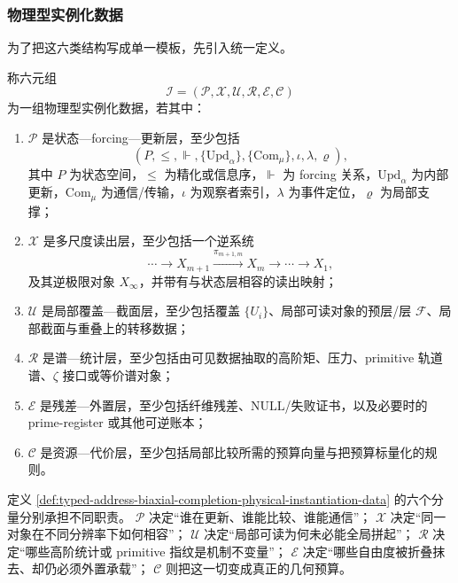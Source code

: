 \subsubsection{物理型实例化数据}\label{subsubsec:typed-address-biaxial-completion-physical-instantiation-data}
为了把这六类结构写成单一模板，先引入统一定义。

\begin{definition}[物理型实例化数据]\label{def:typed-address-biaxial-completion-physical-instantiation-data}
称六元组
\[
\mathcal I=
(\mathcal P,\mathcal X,\mathcal U,\mathcal R,\mathcal E,\mathcal C)
\]
为一组物理型实例化数据，若其中：
\begin{enumerate}
  \item \(\mathcal P\) 是状态—forcing—更新层，至少包括
  \[
  (P,\le,\Vdash,\{\mathrm{Upd}_\alpha\},\{\mathrm{Com}_\mu\},\iota,\lambda,\varrho),
  \]
  其中 \(P\) 为状态空间，\(\le\) 为精化或信息序，\(\Vdash\) 为 forcing 关系，\(\mathrm{Upd}_\alpha\) 为内部更新，\(\mathrm{Com}_\mu\) 为通信/传输，\(\iota\) 为观察者索引，\(\lambda\) 为事件定位，\(\varrho\) 为局部支撑；
  \item \(\mathcal X\) 是多尺度读出层，至少包括一个逆系统
  \[
  \cdots \longrightarrow X_{m+1}\xrightarrow{\pi_{m+1,m}}X_m\longrightarrow\cdots\longrightarrow X_1,
  \]
  及其逆极限对象 \(X_\infty\)，并带有与状态层相容的读出映射；
  \item \(\mathcal U\) 是局部覆盖—截面层，至少包括覆盖 \(\{U_i\}\)、局部可读对象的预层/层 \(\mathscr F\)、局部截面与重叠上的转移数据；
  \item \(\mathcal R\) 是谱—统计层，至少包括由可见数据抽取的高阶矩、压力、primitive 轨道谱、\(\zeta\) 接口或等价谱对象；
  \item \(\mathcal E\) 是残差—外置层，至少包括纤维残差、\(\mathrm{NULL}\)/失败证书，以及必要时的 prime-register 或其他可逆账本；
  \item \(\mathcal C\) 是资源—代价层，至少包括局部比较所需的预算向量与把预算标量化的规则。
\end{enumerate}
\end{definition}

定义 \ref{def:typed-address-biaxial-completion-physical-instantiation-data} 的六个分量分别承担不同职责。
\(\mathcal P\) 决定“谁在更新、谁能比较、谁能通信”；
\(\mathcal X\) 决定“同一对象在不同分辨率下如何相容”；
\(\mathcal U\) 决定“局部可读为何未必能全局拼起”；
\(\mathcal R\) 决定“哪些高阶统计或 primitive 指纹是机制不变量”；
\(\mathcal E\) 决定“哪些自由度被折叠抹去、却仍必须外置承载”；
\(\mathcal C\) 则把这一切变成真正的几何预算。


